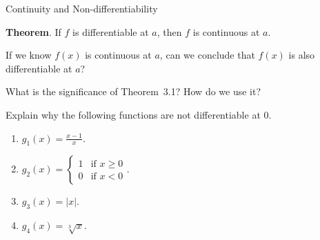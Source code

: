\documentclass[../main.tex]{subfiles}
\begin{document}
\begin{lesson}{Continuity and Non-differentiability}
  \begin{mdframed}[style=withref-compact] \label{thm:differentiability-implies-continuity}
    \textbf{Theorem}. If \(f\) is {differentiable} at \(a\), then \(f\) is {continuous} at \(a\).

  \end{mdframed}

  \faComment{} If we know \(f(x)\) is continuous at \(a\), can we conclude that \(f(x)\) is also differentiable at \(a\)?

  \faComment{} What is the significance of Theorem~3.1? How do we use it?

  \begin{example}
    Explain why the following functions are not differentiable at \(0\).

    \begin{enumerate}
      \item \(g_{1}(x) = \frac{x - 1}{x}\).

      \item \(g_{2}(x) = \begin{cases} 1 &\text{if } x \ge 0 \\ 0 &\text{if } x < 0 \end{cases}\).

      \item \(g_{3}(x) = |x|\).

      \item \(g_{4}(x) = \sqrt[3]{x}\). 

    \end{enumerate}
  \end{example}

  \clearpage


\end{lesson}
\end{document}
